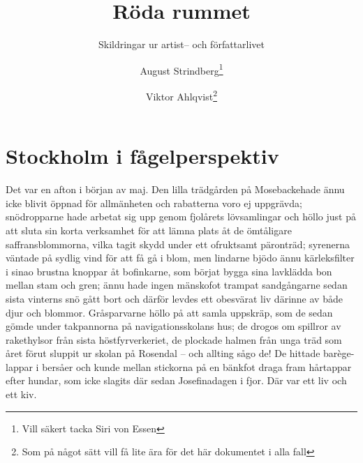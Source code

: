 \documentclass[%
	]{scrartcl}
\title{Röda rummet}
\subtitle{Skildringar ur artist-- och författarlivet}
\author{August Strindberg\thanks{Vill säkert tacka Siri von Essen} \and Viktor Ahlqvist\thanks{Som på något sätt vill få lite ära för det här dokumentet i alla fall}}
\begin{document}
\maketitle 			%
\tableofcontents	%

\section{Stockholm i fågelperspektiv}
Det var en afton i början av maj. Den lilla trädgården på Mosebackehade ännu 
icke blivit öppnad för allmänheten och rabatterna voro ej uppgrävda; 
snödropparne hade arbetat sig upp genom fjolårets lövsamlingar och höllo just 
på att sluta sin korta verksamhet för att lämna plats åt de ömtåligare 
saffransblommorna, vilka tagit skydd under ett ofruktsamt päronträd; syrenerna 
väntade på sydlig vind för att få gå i blom, men lindarne bjödo ännu 
kärleksfilter i sinao brustna knoppar åt bofinkarne, som börjat bygga sina 
lavklädda bon mellan stam och gren; ännu hade ingen mänskofot trampat 
sandgångarne sedan sista vinterns snö gått bort och därför levdes ett obesvärat 
liv därinne av både djur och blommor. Gråsparvarne höllo på att samla uppskräp, 
som de sedan gömde under takpannorna på navigationsskolans hus; de drogos om 
spillror av rakethylsor från sista höstfyrverkeriet, de plockade halmen från 
unga träd som året förut sluppit ur skolan på Rosendal -- och allting sågo de! 
De hittade barège-lappar i bersåer och kunde mellan stickorna på en bänkfot 
draga fram hårtappar efter hundar, som icke slagits där sedan Josefinadagen i 
fjor. Där var ett liv och ett kiv.
\end{document}

